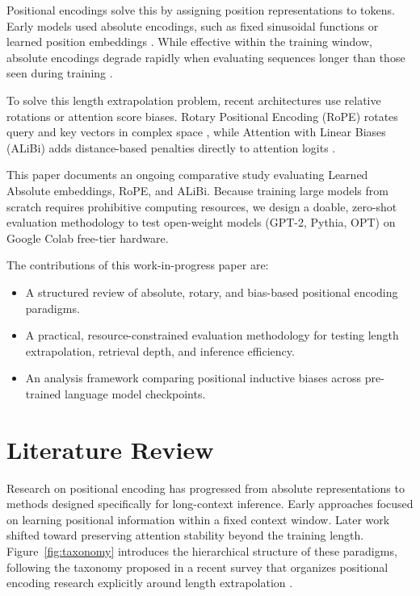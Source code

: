 \documentclass[conference]{IEEEtran}
\begin{document}
Positional encodings solve this by assigning position representations to tokens. Early models used absolute encodings, such as fixed sinusoidal functions or learned position embeddings \cite{vaswani2017,devlin2019,radford2019}. While effective within the training window, absolute encodings degrade rapidly when evaluating sequences longer than those seen during training \cite{press2022}.

To solve this length extrapolation problem, recent architectures use relative rotations or attention score biases. Rotary Positional Encoding (RoPE) rotates query and key vectors in complex space \cite{su2024roformer}, while Attention with Linear Biases (ALiBi) adds distance-based penalties directly to attention logits \cite{press2022}.

This paper documents an ongoing comparative study evaluating Learned Absolute embeddings, RoPE, and ALiBi. Because training large models from scratch requires prohibitive computing resources, we design a doable, zero-shot evaluation methodology to test open-weight models (GPT-2, Pythia, OPT) on Google Colab free-tier hardware.

The contributions of this work-in-progress paper are:
\begin{itemize}
\item A structured review of absolute, rotary, and bias-based positional encoding paradigms.
\item A practical, resource-constrained evaluation methodology for testing length extrapolation, retrieval depth, and inference efficiency.
\item An analysis framework comparing positional inductive biases across pre-trained language model checkpoints.
\end{itemize}

\section{Literature Review}
\label{sec:literature}

Research on positional encoding has progressed from absolute representations to methods designed specifically for long-context inference. Early approaches focused on learning positional information within a fixed context window. Later work shifted toward preserving attention stability beyond the training length. Figure~\ref{fig:taxonomy} introduces the hierarchical structure of these paradigms, following the taxonomy proposed in a recent survey that organizes positional encoding research explicitly around length extrapolation \cite{zhao2024survey}.
\end{document}
